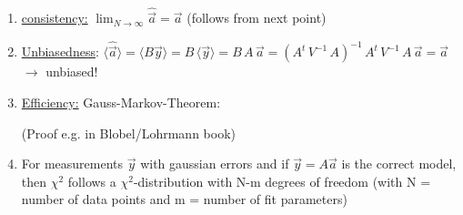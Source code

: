 \begin{slide}
\pagestyle{headings}
\sf
%
%
\large 
\sf
\begin{enumerate}
\item 
\underline{consistency:} $\lim_{N\rightarrow \infty } \hat{\vec{a}} = \vec{a}$
\hspace{1cm} (follows from next point)
\item 
\underline{Unbiasedness}: 
$\langle \hat{\vec{a}} \rangle = 
\langle B \vec{y} \rangle = 
B\, \langle \vec{y} \rangle = 
B \,A \,\vec{a} = 
(A^t\, V^{-1}\, A)^{-1}  \,A^t \,V^{-1}\, A \,\vec{a} = \vec{a}
$\\
$\rightarrow$ unbiased!
\item \underline{Efficiency:} Gauss-Markov-Theorem: \\[2mm]

{\normalsize(Proof e.g. in Blobel/Lohrmann book)}
%
\item 
For measurements $\vec{y}$ with gaussian errors and if
$\vec{y} = A \vec{a}$ is the correct model,
then $\chi^2$ follows 
a $\chi^2$-distribution with 
N-m degrees of freedom 
(with N  = number of data points and m = number of fit parameters)
\end{enumerate}
%
\end{slide}
